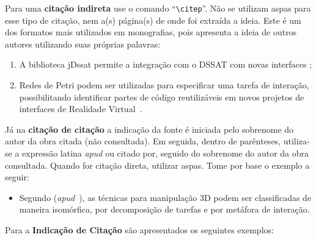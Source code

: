 Para uma \textbf{citação indireta} use o comando ``\texttt{\textbackslash citep}''. Não se utilizam aspas para esse tipo de citação, nem a(s) página(s) de onde foi extraída a ideia. Este é um dos formatos mais utilizados em monografias, pois apresenta a ideia de outros autores utilizando suas próprias palavras:

\begin{enumerate}[label=\alph*)]
	\item A biblioteca jDssat permite a integração com o DSSAT com novas interfaces \citep{Resenes2019};
	\item Redes de Petri podem ser utilizadas para especificar uma tarefa de interação, possibilitando identificar partes de código reutilizáveis em novos projetos de interfaces de Realidade Virtual~\citep{RIE10}.
\end{enumerate}

Já na \textbf{citação de citação} a indicação da fonte é iniciada pelo sobrenome do autor da obra citada (não consultada). Em seguida, dentro de parênteses, utiliza-se a expressão latina \textit{apud} ou citado por, seguido do sobrenome do autor da obra consultada. Quando for citação direta, utilizar aspas. Tome por base o exemplo a seguir:
\begin{itemize}
	\item Segundo \cite{BOW02} (\textit{apud}~\cite{BOW04}), as técnicas para manipulação 3D podem ser classificadas de maneira isomórfica, por decomposição de tarefas e por metáfora de interação.
\end{itemize}

Para a \textbf{Indicação de Citação} são apresentados os seguintes exemplos:

